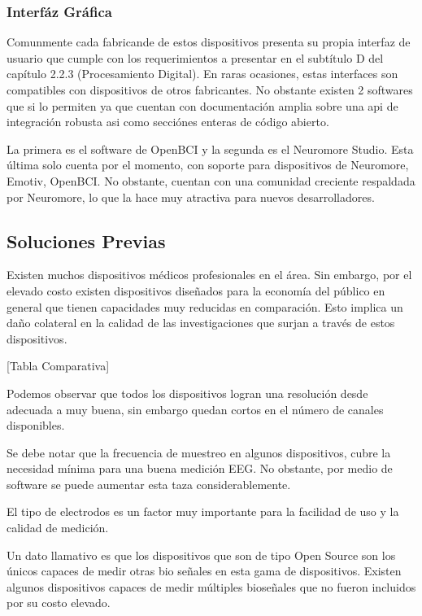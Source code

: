 \subsubsection{Interfáz Gráfica}
\label{sec:org7e80a7e}
Comunmente cada fabricande de estos dispositivos presenta su propia interfaz de usuario que cumple con los requerimientos a presentar en el subtítulo D del capítulo 2.2.3 (Procesamiento Digital). En raras ocasiones, estas interfaces son compatibles con dispositivos de otros fabricantes. No obstante existen 2 softwares que si lo permiten ya que cuentan con documentación amplia sobre una api de integración robusta asi como secciónes enteras de código abierto.

La primera es el software de OpenBCI y la segunda es el Neuromore Studio. Esta última solo cuenta por el momento, con soporte para dispositivos de Neuromore, Emotiv, OpenBCI. No obstante, cuentan con una comunidad creciente respaldada por Neuromore, lo que la hace muy atractiva para nuevos desarrolladores.

\subsection{Soluciones Previas}
\label{sec:orgcd055c2}
Existen muchos dispositivos médicos profesionales en el área. Sin embargo, por el elevado costo existen dispositivos diseñados para la economía del público en general que tienen capacidades muy reducidas en comparación.
Esto implica un daño colateral en la calidad de las investigaciones que surjan a través de estos dispositivos.

[Tabla Comparativa]

Podemos observar que todos los dispositivos logran una resolución desde adecuada a muy buena, sin embargo quedan cortos en el número de canales disponibles.

Se debe notar que la frecuencia de muestreo en algunos dispositivos, cubre la necesidad mínima para una buena medición EEG. No obstante, por medio de software se puede aumentar esta taza considerablemente.

El tipo de electrodos es un factor muy importante para la facilidad de uso y la calidad de medición.

Un dato llamativo es que los dispositivos que son de tipo Open Source son los únicos capaces de medir otras bio señales en esta gama de dispositivos. Existen algunos dispositivos capaces de medir múltiples bioseñales que no fueron incluidos por su costo elevado.

